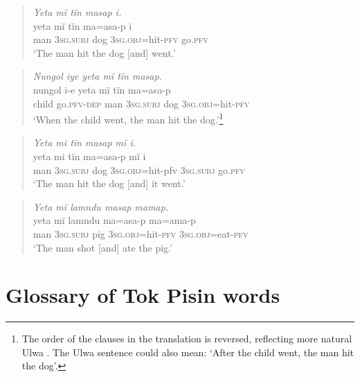 \begin{quote}\textit{Yeta mï tïn masap i.}\\
\gll    yeta  mï      tïn    ma=asa-p      i\\
    man  \textsc{3sg.subj}  dog  \textsc{3sg.obj}=hit-\textsc{pfv}  go.\textsc{pfv}\\
\glt    ‘The man hit the dog [and] went.’\end{quote}

\begin{quote}\textit{Nungol iye yeta mï tïn masap.}\\
\gll    nungol  i-e        yeta  mï      tïn    ma=asa-p\\
    child  go.\textsc{pfv-dep}  man  \textsc{3sg.subj}  dog  \textsc{3sg.obj}=hit-\textsc{pfv}\\
\glt    ‘When the child went, the man hit the dog.’\footnote{The order of the clauses in the translation is reversed, reflecting more natural Ulwa . The Ulwa sentence could also mean: ‘After the child went, the man hit the dog’.}\end{quote}

\begin{quote}\textit{Yeta mi tïn masap mï i.}\\
\gll    yeta  mi      tïn    ma=asa-p      mï      i\\
    man  \textsc{3sg.subj}  dog  \textsc{3sg.obj}=hit-pfv  \textsc{3sg.subj}  go.\textsc{pfv}\\
\glt    ‘The man hit the dog [and] it went.’\end{quote}

\begin{quote}\textit{Yeta mï lamndu masap mamap.}\\
\gll    yeta  mï      lamndu  ma=asa-p      ma=ama-p\\
    man  \textsc{3sg.subj}  pig      \textsc{3sg.obj}=hit-\textsc{pfv}  \textsc{3sg.obj}=eat-\textsc{pfv}\\
\glt    ‘The man shot [and] ate the pig.’\end{quote}


\chapter{Glossary of Tok Pisin words}\label{sec:app.d}

